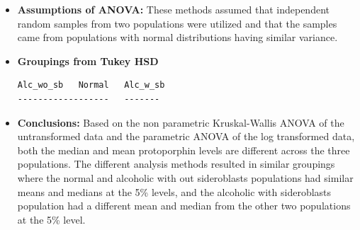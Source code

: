 \documentclass{article}\usepackage[]{graphicx}\usepackage[]{color}
\begin{document}
\begin{itemize}
\item \textbf{Assumptions of ANOVA:} These methods assumed that independent random samples from
two populations were utilized and
that the samples came from populations with normal distributions having similar variance.

\item \textbf{Groupings from Tukey HSD}
\begin{verbatim}
Alc_wo_sb   Normal   Alc_w_sb
------------------   -------
\end{verbatim}


\item \textbf{Conclusions:} Based on the non parametric Kruskal-Wallis ANOVA of the untransformed data
and the parametric ANOVA of the log transformed data, both the median and mean protoporphin levels
are different across the three populations.  The different analysis methods resulted in
similar groupings where the normal and alcoholic with out sideroblasts  populations had
similar means and medians at the 5\% levels, and the alcoholic with sideroblasts population
had a different mean and median from the other two populations at the 5\% level.

\end{itemize}
\end{document}

